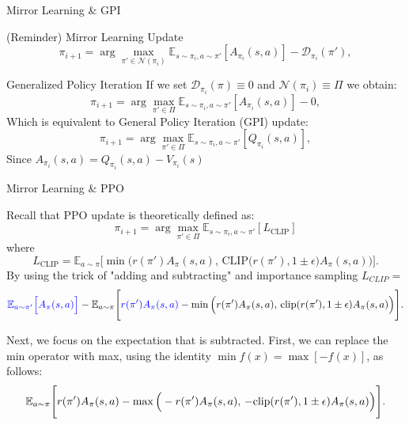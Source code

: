 \documentclass[9pt]{beamer}
\begin{document}
\begin{frame}{Mirror Learning \& GPI}
  \begin{block}{(Reminder) Mirror Learning Update}
    \vspace{1em}  %
    \[
    \pi_{i+1} = \arg \max_{\pi' \in \mathcal{N}(\pi_i)} \mathbb{E}_{s \sim \pi_i, a \sim \pi'} \left[ A_{\pi_i}(s, a) \right] - \mathcal{D}_{\pi_i}(\pi'),
  \]
    \vspace{1em}  %
  \end{block}
  
  \begin{block}{Generalized Policy Iteration}
    \vspace{1em}  %
  If we set \( \mathcal{D}_{\pi_i}(\pi) \equiv 0\) and \(\mathcal{N}(\pi_i) \equiv \Pi\) we obtain:
\[
    \pi_{i+1} = \arg \max_{\pi' \in \Pi} \mathbb{E}_{s \sim \pi_i, a \sim \pi'} \left[ A_{\pi_i}(s, a) \right] - 0,
    \]
\pause
  Which is equivalent to General Policy Iteration (GPI) update:
\[
    \pi_{i+1} = \arg \max_{\pi' \in \Pi} \mathbb{E}_{s \sim \pi_i, a \sim \pi'} \left[ Q_{\pi_i}(s, a) \right],
    \]
  Since \(A_{\pi_i}(s, a) = Q_{\pi_i}(s, a) - V_{\pi_i}(s)\)
    \vspace{1em}  %
  \end{block}
  
\end{frame}

\begin{frame}{Mirror Learning \& PPO}

Recall that PPO update is theoretically defined as:
\[
  \pi_{i+1} = \arg \max_{\pi' \in \Pi} \mathbb{E}_{s \sim \pi_i, a \sim \pi'} \left[ L_{\text{CLIP}} \right]
\]
  where
  \[
    L_{\text{CLIP}} = \mathbb{E}_{a \sim \pi} \Bigg[ \min \Bigg( r(\pi') A_{\pi}(s, a), \, \text{CLIP}\Big(r(\pi'), 1 \pm \epsilon\Big) A_{\pi}(s, a) \Bigg) \Bigg].
\]
\pause
  By using the trick of "adding and subtracting" and importance sampling \( L_{CLIP} =\)
  \[
    \textcolor{blue}{\mathbb{E}_{a \sim \pi'} \Big[ A_\pi(s,a) \Big]} -\mathbb{E}_{a \sim \pi} \Bigg[ \textcolor{blue}{r(\pi')A_\pi(s,a)} - \min \Big( r(\pi') A_{\pi}(s, a), \, \text{clip}(r(\pi'), 1 \pm \epsilon) A_{\pi}(s, a) \Big) \Bigg].
\]

\pause
  Next, we focus on the expectation that is subtracted. First, we can replace the min operator with max, using the identity \( \min f(x) = \max [-f(x)] \), as follows:
  \[
    \mathbb{E}_{a \sim \pi} \Bigg[ \textcolor{black}{r(\pi')A_\pi(s,a)} - \max \Big(-r(\pi') A_{\pi}(s, a), \,-\text{clip}(r(\pi'), 1 \pm \epsilon) A_{\pi}(s, a) \Big) \Bigg].
\]

\end{frame}
\end{document}
